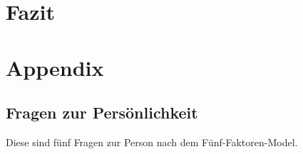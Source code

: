 \documentclass[11pt,a4paper,headsepline,twoside,toc=bibliography]{scrreprt}
\begin{document}
\chapter{Fazit}



\printbibliography



\appendix

\setcounter{secnumdepth}{-1}

\chapter{Appendix}

\setcounter{secnumdepth}{2}

\renewcommand\thesection{\Alph{section}}

\section{Fragen zur Persönlichkeit}
\label{appendix:bigfive}

Diese sind fünf Fragen zur Person nach dem Fünf-Faktoren-Model.   
\end{document}
